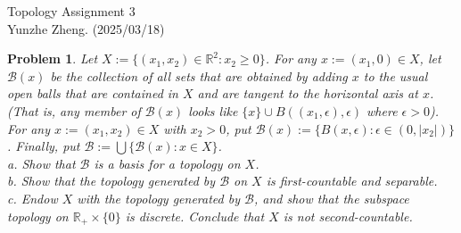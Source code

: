 \documentclass[12pt]{article}
\newtheorem{problem}{Problem}
\begin{document}
\noindent Topology \hfill Assignment 3\\
Yunzhe Zheng. (2025/03/18)

\hrulefill

\begin{problem}
Let $X:= \{(x_{1}, x_{2})\in\mathbb{R}^{2}: x_{2}\geq 0\}$. For any $x:=(x_{1}, 0)\in X$, let $\mathcal{B}(x)$ be the collection of all sets that are obtained by adding $x$ to the usual open balls that are contained in $X$ and are tangent to the horizontal axis at $x$. (That is, any member of $\mathcal{B}(x)$ looks like $\{x\}\cup B((x_{1},\epsilon),\epsilon)$ where $\epsilon>0$). For any $x:=(x_{1},x_{2})\in X$ with $x_{2}>0$, put $\mathcal{B}(x):=\{B(x,\epsilon): \epsilon\in(0,|x_{2}|)\}$. Finally, put $\mathcal{B}:=\bigcup\{\mathcal{B}(x): x\in X\}$. \\
\indent a. Show that $\mathcal{B}$ is a basis for a topology on $X$. \\
\indent b. Show that the topology generated by $\mathcal{B}$ on $X$ is first-countable and separable. \\
\indent c. Endow $X$ with the topology generated by $\mathcal{B}$, and show that the subspace topology on $\mathbb{R}_{+}\times \{0\}$ is discrete. Conclude that $X$ is not second-countable.
\end{problem}
\end{document}
